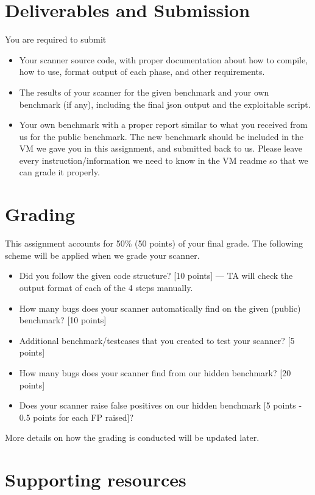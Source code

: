 \documentclass{article}[10pt]
\begin{document}
\section{Deliverables and Submission}
\label{deliverables}
You are required to submit
\begin{itemize}
	\item Your scanner source code, with proper documentation about how to compile, how to use, format output of each phase, and other requirements.
	\item The results of your scanner for the given benchmark and your own benchmark (if any), including the final json output and the exploitable script.
	\item Your own benchmark with a proper report similar to what you received from us for the public benchmark. The new benchmark should be included in the VM we gave you in this assignment, and submitted back to us. Please leave every instruction/information we need to know in the VM readme so that we can grade it properly.
\end{itemize}

\section{Grading}
This assignment accounts for 50\% (50 points) of your final grade. The following scheme will be applied when we grade your scanner.
	\begin{itemize}
	\item Did you follow the given code structure? [10 points] --- TA will check the output format of each of the 4 steps manually.
	\item How many bugs does your scanner automatically find on the given (public) benchmark? [10 points]
	\item Additional benchmark/testcases that you created to test your scanner? [5 points]
	\item How many bugs does your scanner find from our hidden benchmark? [20 points]
	\item Does your scanner raise false positives on our hidden benchmark [5 points - 0.5 points for each FP raised]?
	\end{itemize}

More details on how the grading is conducted will be updated later.

\section{Supporting resources}
\end{document}
